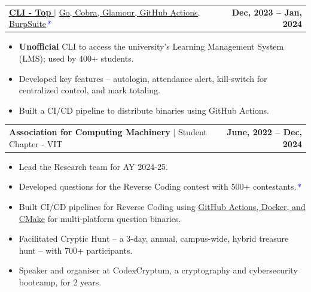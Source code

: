 \documentclass[letterpaper,11pt]{article}
\makeatletter
\newcommand{\resumeItem}[1]{
  \item\small{
    {#1 \vspace{-0.5pt}}
  }
}
\newcommand{\resumeProjectHeading}[2]{
    \item
    \begin{tabular*}{1.001\textwidth}{l@{\extracolsep{\fill}}r}
      \small#1 & \textbf{\small #2}\\
    \end{tabular*}\vspace{-7pt}
}
\newcommand{\resumeItemListStart}{\begin{itemize}}
\newcommand{\resumeItemListEnd}{\end{itemize}\vspace{-5pt}}
\makeatother
\begin{document}
        \resumeProjectHeading
            {\href{https://cli-top.acmvit.in}{\textbf{\large{CLI - Top}} \href{https://cli-top.acmvit.in}{\footnotesize{\raisebox{-0.1\height}\faExternalLink}}} $|$ \normalsize{\href{https://github.com/ACM-VIT/cli-top}{Go, Cobra, Glamour, GitHub Actions, BurpSuite}}\textcolor{blue}{\small{\textit{*}}}}{Dec, 2023 -- Jan, 2024}
            \vspace{-11pt}
            \resumeItemListStart
                \resumeItem{\normalsize{\textbf{Unofficial} CLI to access the university's Learning Management System (LMS); used by 400+ students.}} 
                \resumeItem{\normalsize{Developed key features -- autologin, attendance alert, kill-switch for centralized control, and mark totaling.}}
                \resumeItem{\normalsize{Built a CI/CD pipeline to distribute binaries using GitHub Actions.}}
            \resumeItemListEnd
            \vspace{-15pt}

         \resumeProjectHeading
            {\textbf{\large{Association for Computing Machinery}} $|$ \normalsize{Student Chapter - VIT}}{June, 2022 -- Dec, 2024}
            \vspace{-11pt}
            \resumeItemListStart
                \resumeItem{\normalsize{Lead the Research team for AY 2024-25.}}
                \resumeItem{\normalsize{Developed questions for the Reverse Coding contest with 500+ contestants.\textcolor{blue}{\small{\textit{*}}}}}
                \resumeItem{\normalsize{Built CI/CD pipelines for Reverse Coding using \href{https://github.com/saharshbhansali/rc-23}{GitHub Actions, Docker, and CMake} for multi-platform question binaries. \href{https://github.com/saharshbhansali/rc-23}{\footnotesize{\raisebox{-0.1\height}\faExternalLink}}}}
                \resumeItem{\normalsize{Facilitated Cryptic Hunt -- a 3-day, annual, campus-wide, hybrid treasure hunt -- with 700+ participants.}}
                \resumeItem{\normalsize{Speaker and organiser at CodexCryptum, a cryptography and cybersecurity bootcamp, for 2 years.}}
            \resumeItemListEnd
            \vspace{-12.5pt}
\end{document}
